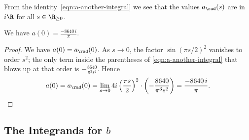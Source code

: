 From the identity~\eqref{eqn:a-another-integral} we see that the values $a_\rad(s)$ are in $i\R$ for all $s\in\R_{\geq0}$.
\begin{proposition}\label{prop:a0}\leanok
We have $a(0) = \frac{-8640\, i}{\pi}$.
\end{proposition}
\begin{proof}
We have $a(0) = a_\rad(0)$. As $s \to 0$, the factor $\sin(\pi s/2)^2$ vanishes to order $s^2$; the only term inside the parentheses of \eqref{eqn:a-another-integral} that blows up at that order is $-\frac{8640}{\pi^3 s^2}$. Hence
\[
  a(0) = a_\rad(0) = \lim_{s \to 0} 4i\left(\frac{\pi s}{2}\right)^2 \cdot \left(-\frac{8640}{\pi^3 s^2}\right) = \frac{-8640\, i}{\pi}.
\]
\end{proof}

\subsection{The Integrands for $b$}

